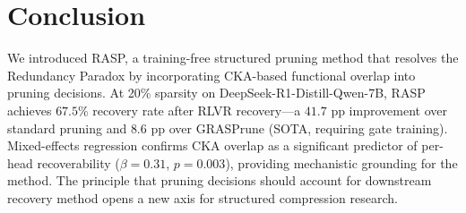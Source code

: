 \documentclass[11pt,a4paper]{article}
\begin{document}
\section{Conclusion}

We introduced RASP, a training-free structured pruning method that resolves the Redundancy Paradox by incorporating CKA-based functional overlap into pruning decisions. At 20\% sparsity on DeepSeek-R1-Distill-Qwen-7B, RASP achieves $67.5$\% recovery rate after RLVR recovery---a $41.7$ pp improvement over standard pruning and $8.6$ pp over GRASPrune (SOTA, requiring gate training). Mixed-effects regression confirms CKA overlap as a significant predictor of per-head recoverability ($\beta = 0.31$, $p = 0.003$), providing mechanistic grounding for the method. The principle that pruning decisions should account for downstream recovery method opens a new axis for structured compression research.
\end{document}
